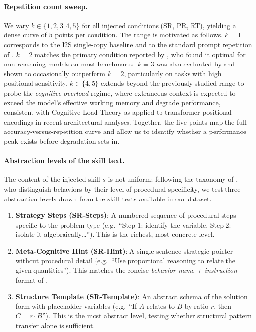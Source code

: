 \paragraph{Repetition count sweep.}
We vary $k \in \{1, 2, 3, 4, 5\}$ for all injected conditions
(SR, PR, RT), yielding a dense curve of 5 points per condition.
The range is motivated as follows.
$k{=}1$ corresponds to the I2S single-copy baseline \cite{wang2025harm} and to the
standard prompt repetition of \citet{leviathan2025prompt}.
$k{=}2$ matches the primary condition reported by \citeauthor{leviathan2025prompt},
who found it optimal for non-reasoning models on most benchmarks.
$k{=}3$ was also evaluated by \citeauthor{leviathan2025prompt} and shown to
occasionally outperform $k{=}2$, particularly on tasks with high positional sensitivity.
$k \in \{4, 5\}$ extends beyond the previously studied range to probe
the \emph{cognitive overload} regime, where extraneous context is expected
to exceed the model's effective working memory and degrade performance,
consistent with Cognitive Load Theory as applied to transformer positional encodings
in recent architectural analyses.
Together, the five points map the full accuracy-versus-repetition curve and allow us to
identify whether a performance peak exists before degradation sets in.

\paragraph{Abstraction levels of the skill text.}
The content of the injected skill $s$ is not uniform: following the taxonomy of
\citet{didolkar2025metacognitive}, who distinguish behaviors by their level of
procedural specificity, we test three abstraction levels drawn from the skill texts
available in our dataset:

\begin{enumerate}
  \item \textbf{Strategy Steps (SR-Steps)}: A numbered sequence of procedural steps
        specific to the problem type (e.g.\ ``Step 1: identify the variable.
        Step 2: isolate it algebraically\ldots'').
        This is the richest, most concrete level.
  \item \textbf{Meta-Cognitive Hint (SR-Hint)}: A single-sentence strategic pointer
        without procedural detail (e.g.\ ``Use proportional reasoning to relate the
        given quantities''). This matches the concise \emph{behavior name + instruction}
        format of \citet{didolkar2025metacognitive}.
  \item \textbf{Structure Template (SR-Template)}: An abstract schema of the solution
        form with placeholder variables (e.g.\ ``If $A$ relates to $B$ by ratio $r$,
        then $C = r \cdot B$'').
        This is the most abstract level, testing whether structural pattern transfer
        alone is sufficient.
\end{enumerate}

